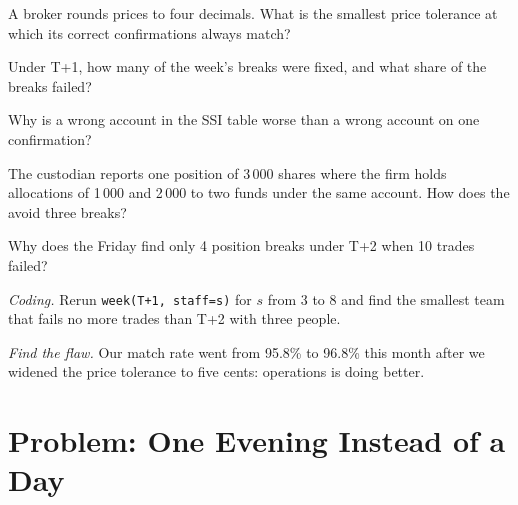 \begin{exercise}[$\star$]\label{exo:pl:post-trade-systems:2}
A broker rounds prices to four decimals. What is the smallest price tolerance at which its correct confirmations always match?
\end{exercise}

\begin{exercise}[$\star$]\label{exo:pl:post-trade-systems:3}
Under T+1, how many of the week's breaks were fixed, and what share of the breaks failed?
\end{exercise}

\begin{exercise}[$\star\star$]\label{exo:pl:post-trade-systems:4}
Why is a wrong account in the SSI table worse than a wrong account on one confirmation?
\end{exercise}

\begin{exercise}[$\star\star$]\label{exo:pl:post-trade-systems:5}
The custodian reports one position of 3\,000 shares where the firm holds allocations of 1\,000 and 2\,000 to two funds under the same account.
How does the  avoid three breaks?
\end{exercise}

\begin{exercise}[$\star\star$]\label{exo:pl:post-trade-systems:6}
Why does the Friday  find only 4 position breaks under T+2 when 10 trades failed?
\end{exercise}

\begin{exercise}[$\star\star\star$]\label{exo:pl:post-trade-systems:7}
\emph{Coding.} Rerun \texttt{week(\textquotedbl T+1\textquotedbl, staff=s)} for $s$ from 3 to 8 and find the smallest team that fails no more
trades than T+2 with three people.
\end{exercise}

\begin{exercise}[$\star\star\star$]\label{exo:pl:post-trade-systems:8}
\emph{Find the flaw.} \textquotedbl{}Our match rate went from 95.8\% to 96.8\% this month after we widened the price tolerance to five cents:
operations is doing better.\textquotedbl{}
\end{exercise}

\section{Problem: One Evening Instead of a Day}

